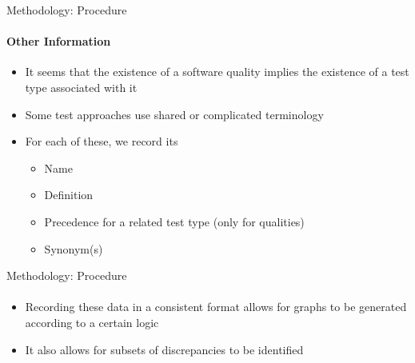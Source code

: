 \documentclass{beamer}
\begin{document}
\begin{frame}{Methodology: Procedure}
    \framesubtitle{Other Information}
    \begin{itemize}
        \item It seems that the existence of a software quality implies the
              existence of a test type associated with it \pause
        \item Some test approaches use shared or complicated terminology \pause
        \item For each of these, we record its
              \begin{itemize}
                  \item Name
                  \item Definition
                  \item Precedence for a related test type (only for qualities)
                  \item Synonym(s)
              \end{itemize}
    \end{itemize}
\end{frame}

\begin{frame}{Methodology: Procedure}
    \framesubtitle{}
    \begin{itemize}
        \item Recording these data in a consistent format allows for graphs to
              be generated according to a certain logic \pause
        \item It also allows for subsets of discrepancies to be identified \pause
              \vspace{1cm}\rqb{}
    \end{itemize}
\end{frame}
\end{document}
